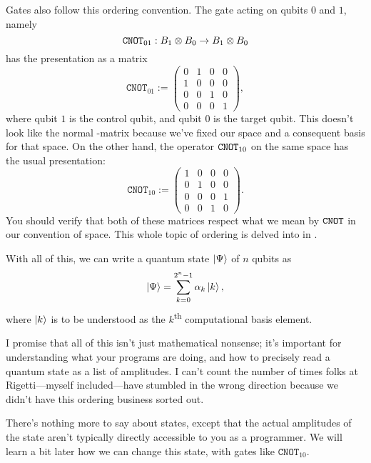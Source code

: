 Gates also follow this ordering convention. The \CNOT{} gate acting on qubits $0$ and $1$, namely
\begin{displaymath}
\mathtt{CNOT}_{01} : B_1 \otimes B_0 \to B_1 \otimes B_0
\end{displaymath}
has the presentation as a matrix
\begin{displaymath}
\texttt{CNOT}_{01} :=
\begin{pmatrix}
0 & 1 & 0 & 0\\
1 & 0 & 0 & 0\\
0 & 0 & 1 & 0\\
0 & 0 & 0 & 1
\end{pmatrix},
\end{displaymath}
where qubit $1$ is the control qubit, and qubit $0$ is the target qubit. This doesn't look like the normal \CNOT{}-matrix because we've fixed our space and a consequent basis for that space. On the other hand, the operator $\mathtt{CNOT}_{10}$ on the same space has the usual presentation:
\begin{displaymath}
\texttt{CNOT}_{10} :=
\begin{pmatrix}
1 & 0 & 0 & 0\\
0 & 1 & 0 & 0\\
0 & 0 & 0 & 1\\
0 & 0 & 1 & 0
\end{pmatrix}.
\end{displaymath}
You should verify that both of these matrices respect what we mean by $\mathtt{CNOT}{}$ in our convention of space. This whole topic of ordering is delved into in \cite{shouts}.

With all of this, we can write a quantum state $\ket{\Psi}$ of $n$ qubits as
\begin{displaymath}
\ket{\Psi} = \sum_{k=0}^{2^n-1} \alpha_k\ket{k},
\end{displaymath}
where $\ket{k}$ is to be understood as the $k$\textsuperscript{th} computational basis element.

I promise that all of this isn't just mathematical nonsense; it's important for understanding what your programs are doing, and how to precisely read a quantum state as a list of amplitudes. I can't count the number of times folks at Rigetti---myself included---have stumbled in the wrong direction because we didn't have this ordering business sorted out.

There's nothing more to say about states, except that the actual amplitudes of the state aren't typically directly accessible to you as a programmer. We will learn a bit later how we can change this state, with gates like $\texttt{CNOT}_{10}$.


